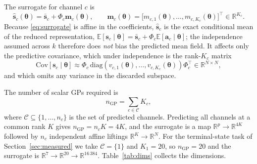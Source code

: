 \documentclass[11pt]{article}
\newcommand{\R}{\mathbb{R}}
\newcommand{\E}{\mathbb{E}}
\newcommand{\bs}[1]{\boldsymbol{#1}}
\begin{document}
The surrogate for channel $c$ is
\begin{equation}
  \hat{\bs{s}}_c(\bs{\theta}) = \bar{\bs{s}}_c + \Phi_c \bs{m}_c(\bs{\theta}),
  \qquad
  \bs{m}_c(\bs{\theta}) = \big[ m_{c,1}(\bs{\theta}), \ldots, m_{c,K_c}(\bs{\theta})
  \big]^{\top} \in \R^{K_c} .
  \label{eq:surrogate}
\end{equation}
Because \eqref{eq:surrogate} is affine in the coefficients, $\hat{\bs{s}}_c$ is the exact
conditional mean of the reduced representation,
$\E[\bs{s}_c \mid \bs{\theta}] = \bar{\bs{s}}_c + \Phi_c \E[\bs{a}_c \mid \bs{\theta}]$;
the independence assumed across $k$ therefore does \emph{not} bias the predicted mean field.
It affects only the predictive covariance, which under independence is the rank-$K_c$ matrix
\begin{equation}
  \mathrm{Cov}\!\left[ \bs{s}_c \mid \bs{\theta} \right]
  \approx \Phi_c \, \mathrm{diag}\!\left( v_{c,1}(\bs{\theta}), \ldots,
  v_{c,K_c}(\bs{\theta}) \right) \Phi_c^{\top} \in \R^{N \times N},
  \label{eq:field-cov}
\end{equation}
and which omits any variance in the discarded subspace.

The number of scalar GPs required is
\begin{equation}
  n_{\mathrm{GP}} = \sum_{c \in \mathcal{C}} K_c ,
  \label{eq:ngp}
\end{equation}
where $\mathcal{C} \subseteq \{1, \ldots, n_c\}$ is the set of predicted channels.
Predicting all channels at a common rank $K$ gives $n_{\mathrm{GP}} = n_c K = 4K$, and the
surrogate is a map $\R^{p} \to \R^{4K}$ followed by $n_c$ independent affine liftings
$\R^{K} \to \R^{N}$. For the terminal-state task of Section~\ref{sec:measured} we take
$\mathcal{C} = \{1\}$ and $K_1 = 20$, so $n_{\mathrm{GP}} = 20$ and the surrogate is
$\R^{7} \to \R^{20} \to \R^{16\,384}$. Table~\ref{tab:dims} collects the dimensions.
\end{document}

